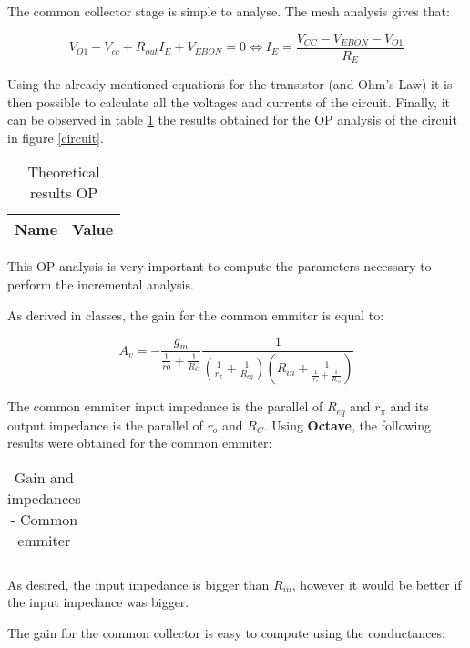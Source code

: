 The common collector stage is simple to analyse. The mesh analysis gives that:

\begin{equation}
        V_{O1}-V_{cc}+R_{out}I_E+V_{EBON} = 0 \iff I_E = \frac{V_{CC}-V_{EBON}-V_{O1}}{R_E}
\end{equation}

Using the already mentioned equations for the transistor (and Ohm's Law) it is then possible to calculate all the voltages and currents of the circuit. Finally, it can be observed in table \ref{opteorico} the results obtained for the OP analysis of the circuit in figure \ref{circuit}.

\begin{table}[H]
  \centering
  \begin{tabular}{|c|c|}
    \hline
        {\bf Name} & {\bf Value} \\
        \hline
        \hline
        
        \hline
  \end{tabular}
  \caption{Theoretical results OP}
  \label{opteorico}
\end{table}

This OP analysis is very important to compute the parameters necessary to perform the incremental analysis.

As derived in classes, the gain for the common emmiter is equal to:

\begin{equation}
        A_v = -\frac{g_m}{\frac{1}{ro}+\frac{1}{R_C}}\frac{1}{(\frac{1}{r_{\pi}}+\frac{1}{R_{eq}})(R_{in}+\frac{1}{\frac{1}{r_{\pi}}+\frac{1}{R_{eq}}})}
\end{equation}

The common emmiter input impedance is the parallel of $R_{eq}$ and $r_{\pi}$ and its output impedance is the parallel of $r_o$ and $R_C$. Using {\bf Octave}, the following results were obtained for the common emmiter:

\begin{table}[H]
  \centering
  \begin{tabular}{|c|c|}
    \hline
        
        \hline
  \end{tabular}
  \caption{Gain and impedances - Common emmiter}
  \label{gainemmiter}
\end{table}

As desired, the input impedance is bigger than $R_{in}$, however it would be better if the input impedance was bigger.

The gain for the common collector is easy to compute using the conductances:

